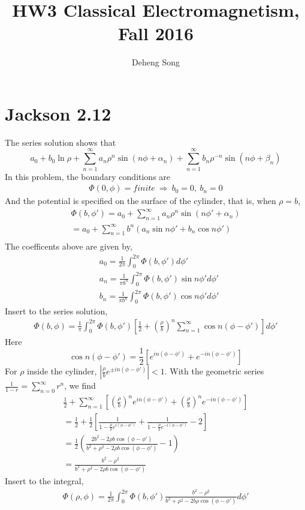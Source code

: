 \documentclass[notitlepage]{revtex4-1}
\begin{document}
\title{HW3 Classical Electromagnetism, Fall 2016}
\author{Deheng Song}
\maketitle
\nopagebreak[4]
\section*{Jackson 2.12}
The series solution shows that
\[
  a_0 + b_0 \ln\rho+\sum^{\infty}_{n=1} a_n \rho^n \sin(n\phi+\alpha_n)+\sum^{\infty}_{n=1} b_n \rho^{-n} \sin(n\phi+\beta_n)
\]
In this problem, the boundary conditions are
%
\begin{align*}
   \Phi(0,\phi)=finite\ \Rightarrow\ b_0=0,\ b_n=0
\end{align*}
%
And the potential is specified on the surface of the cylinder, that is, when $\rho=b$,
%
\begin{align*}
  \Phi(b,\phi')=a_0+\sum^{\infty}_{n=1} a_n \rho^n \sin(n\phi'+\alpha_n)\\
  =a_0+\sum^{\infty}_{n=1} b^n (a_n\sin n\phi'+b_n\cos n\phi')\\
\end{align*}
%
The coefficents above are given by,
%
\begin{align*}
  &a_0=\frac{1}{2\pi}\int^{2\pi}_{0}\Phi(b,\phi')d\phi'\\
  &a_n=\frac{1}{\pi b^n}\int^{2\pi}_{0}\Phi(b,\phi')\sin n\phi' d\phi'\\
  &b_n=\frac{1}{\pi b^n}\int^{2\pi}_{0}\Phi(b,\phi')\cos n\phi' d\phi'
\end{align*}
Insert to the series solution,
\begin{align*}
  \Phi(b,\phi)=\frac{1}{\pi}\int^{2\pi}_{0}\Phi(b,\phi')[\frac{1}{2}+(\frac{\rho}{b})^n\sum^{\infty}_{n=1}\cos n(\phi-\phi')]d\phi'
\end{align*}
Here
\[\cos n(\phi-\phi')=\frac{1}{2}[e^{in(\phi-\phi')}+e^{-in(\phi-\phi')}]\]
For $\rho$ inside the cylinder, $|\frac{\rho}{b}e^{\pm in(\phi-\phi')}|<1$. With the geometric series $\frac{1}{1-r}=\sum^{\infty}_{n=0}r^n$, we find
\begin{align*}
  \frac{1}{2}+\sum^{\infty}_{n=1}[(\frac{\rho}{b})^n e^{in(\phi-\phi')}+(\frac{\rho}{b})^n e^{-in(\phi-\phi')}]\\
  = \frac{1}{2}+\frac{1}{2}[\frac{1}{1-\frac{\rho}{b}e^{i(\phi-\phi')}}+\frac{1}{1-\frac{\rho}{b}e^{-i(\phi-\phi')}}-2]\\
  =\frac{1}{2}(\frac{2b^2-2\rho b\cos(\phi-\phi')}{b^2+\rho^2-2\rho b\cos(\phi-\phi')}-1)\\
  =\frac{b^2-\rho^2}{b^2+\rho^2-2\rho b\cos(\phi-\phi')}
\end{align*}
Insert to the integral,
\begin{align*}
  \Phi(\rho,\phi)=\frac{1}{2\pi}\int^{2\pi}_0\Phi(b,\phi')\frac{b^2-\rho^2}{b^2+\rho^2-2b\rho\cos(\phi-\phi')}d\phi'
\end{align*}
\pagebreak
\end{document}
